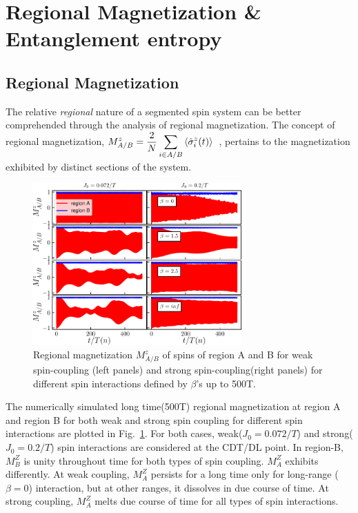 \documentclass[%
reprint,
superscriptaddress,
amsmath,amssymb,showkeys,
aps,
prb,
]{revtex4-2}
\begin{document}
	\section{\label{sec:level4}Regional  Magnetization \& Entanglement entropy}
	
	\subsection{\label{sec:level42} Regional Magnetization}
	The relative \textit{regional} nature of a segmented spin system can be better comprehended through the analysis of regional magnetization. The concept of regional magnetization, $\displaystyle M^z_{A/B}=\frac{2}{N}\sum_{i\in{A/B}}\expval{\hat{\sigma}^z_i(t)}$~\cite{sakurai_phys_nodate}, pertains to the magnetization exhibited by distinct sections of the system.
	\begin{figure}
		\centering
		\includegraphics[width = 8cm]{clean_J_strong_MzAB_betas.pdf}
		\caption{Regional magnetization $M^z_{A/B}$ of spins of region A and B for weak spin-coupling (left panels) and strong spin-coupling(right panels) for different spin interactions defined by $\beta$'s up to 500T.}
		\label{Fig:regiogionalmag}
	\end{figure}
	The numerically simulated long time(500T) regional magnetization at region A and region B for both weak and strong spin coupling for different spin interactions are plotted in Fig.~\ref{Fig:regiogionalmag}. For both cases, weak($J_0=0.072/T$) and strong($J_0=0.2/T$) spin interactions are considered at the CDT/DL point. In region-B,  $M^Z_B$ is unity throughout time for both types of spin coupling. $M^Z_A$ exhibits differently. At weak coupling, $M^Z_A$ persists for a long time only for long-range ($\beta=0$) interaction, but at other ranges, it dissolves in due course of time. At strong coupling, $M^Z_A$ melts due course of time for all types of spin interactions.
	
\end{document}
